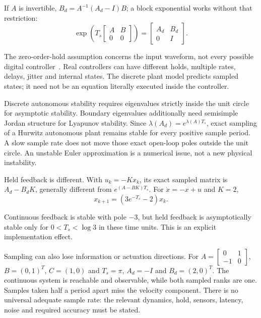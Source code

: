 If $A$ is invertible, $B_d=A^{-1}(A_d-I)B$; a block exponential works without that restriction:
\begin{equation}
\label{eq:state_block_exponential}
 \exp\left(T_s\begin{bmatrix}A&B\\0&0\end{bmatrix}\right)
 =\begin{bmatrix}A_d&B_d\\0&I\end{bmatrix}.
\end{equation}

The zero-order-hold assumption concerns the input waveform, not every possible digital controller~\cite{MathWorksC2dNotes}. Real controllers can have different holds, multiple rates, delays, jitter and internal states. The discrete plant model predicts sampled states; it need not be an equation literally executed inside the controller.

Discrete autonomous stability requires eigenvalues strictly inside the unit circle for asymptotic stability. Boundary eigenvalues additionally need semisimple Jordan structure for Lyapunov stability. Since $\lambda(A_d)=e^{\lambda(A)T_s}$, exact sampling of a Hurwitz autonomous plant remains stable for every positive sample period. A slow sample rate does not move those exact open-loop poles outside the unit circle. An unstable Euler approximation is a numerical issue, not a new physical instability.

Held feedback is different. With $u_k=-Kx_k$, its exact sampled matrix is $A_d-B_dK$, generally different from $e^{(A-BK)T_s}$. For $\dot x=-x+u$ and $K=2$,
\begin{equation}
\label{eq:state_sampled_feedback}
 x_{k+1}=(3e^{-T_s}-2)x_k.
\end{equation}

Continuous feedback is stable with pole $-3$, but held feedback is asymptotically stable only for $0<T_s<\log3$ in these time units. This is an explicit implementation effect.

Sampling can also lose information or actuation directions. For $A=\left[\begin{smallmatrix}0&1\\-1&0\end{smallmatrix}\right]$, $B=(0,1)^T$, $C=(1,0)$ and $T_s=\pi$, $A_d=-I$ and $B_d=(2,0)^T$. The continuous system is reachable and observable, while both sampled ranks are one. Samples taken half a period apart miss the velocity component. There is no universal adequate sample rate: the relevant dynamics, hold, sensors, latency, noise and required accuracy must be stated.

